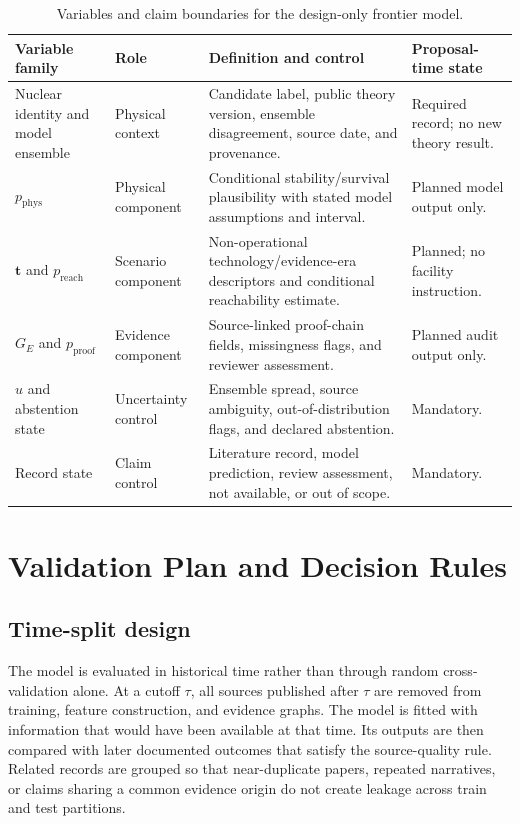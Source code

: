 \documentclass[conference]{IEEEtran}
\begin{document}
\begin{table}[!t]
\caption{Variables and claim boundaries for the design-only frontier model.}
\label{tab:variables}
\centering
\renewcommand{\arraystretch}{1.20}
\begin{tabular}{|P{0.18\textwidth}|P{0.17\textwidth}|P{0.31\textwidth}|P{0.15\textwidth}|}
\hline
\textbf{Variable family} & \textbf{Role} & \textbf{Definition and control} & \textbf{Proposal-time state} \\
\hline
Nuclear identity and model ensemble & Physical context & Candidate label, public theory version, ensemble disagreement, source date, and provenance. & Required record; no new theory result. \\
\hline
$p_{\mathrm{phys}}$ & Physical component & Conditional stability/survival plausibility with stated model assumptions and interval. & Planned model output only. \\
\hline
$\mathbf{t}$ and $p_{\mathrm{reach}}$ & Scenario component & Non-operational technology/evidence-era descriptors and conditional reachability estimate. & Planned; no facility instruction. \\
\hline
$G_E$ and $p_{\mathrm{proof}}$ & Evidence component & Source-linked proof-chain fields, missingness flags, and reviewer assessment. & Planned audit output only. \\
\hline
$u$ and abstention state & Uncertainty control & Ensemble spread, source ambiguity, out-of-distribution flags, and declared abstention. & Mandatory. \\
\hline
Record state & Claim control & Literature record, model prediction, review assessment, not available, or out of scope. & Mandatory. \\
\hline
\end{tabular}
\end{table}

\section{Validation Plan and Decision Rules}

\subsection{Time-split design}

The model is evaluated in historical time rather than through random cross-validation alone. At a cutoff \(\tau\), all sources published after \(\tau\) are removed from training, feature construction, and evidence graphs. The model is fitted with information that would have been available at that time. Its outputs are then compared with later documented outcomes that satisfy the source-quality rule. Related records are grouped so that near-duplicate papers, repeated narratives, or claims sharing a common evidence origin do not create leakage across train and test partitions.
\end{document}
